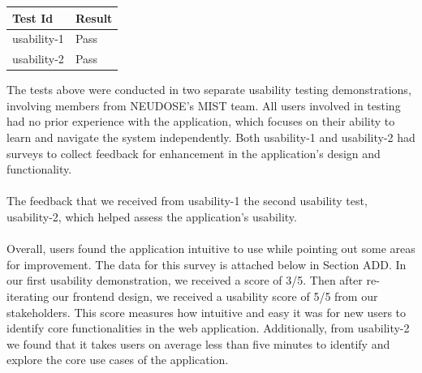 \documentclass[12pt, titlepage]{article}
\begin{document}
\begin{center}
\begin{tabular}{|p{4cm} | p{4cm}| }
\hline
\textbf{Test Id} & \textbf{Result} \\
\hline
usability-1 & Pass \\
\hline
usability-2 & Pass \\
\hline

\end{tabular}
\end{center}
The tests above were conducted in two separate usability testing demonstrations, involving members from NEUDOSE's MIST team. All users involved in testing had no prior experience with the application, which focuses on their ability to learn and navigate the system independently. Both usability-1 and usability-2 had surveys to collect feedback for enhancement in the application’s design and functionality.
\\ \\
The feedback that we received from usability-1 the second
usability test, usability-2, which helped assess the application's usability.
\\ \\ 
Overall, users found the application intuitive to use while pointing out some areas for improvement. The data for this survey is attached below in Section ADD. In our first usability demonstration, we received a score of 3/5. Then after re-iterating our frontend design, we received a usability score of 5/5 from our stakeholders. This score measures how intuitive and easy it was for new users to identify core functionalities in the web application. Additionally, from usability-2 we found that it takes users on average less than five minutes to identify and explore the core use cases of the application.
\end{document}
